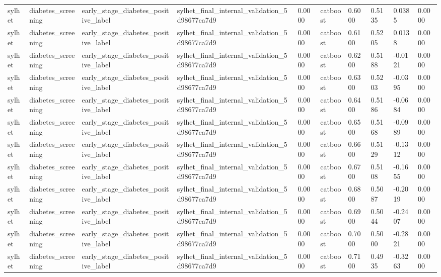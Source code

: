 \begin{tabular}{llllllllll}
sylhet & diabetes\_screening & early\_stage\_diabetes\_positive\_label & sylhet\_final\_internal\_validation\_5d98677ca7d9 & 0.0000 & catboost & 0.6000 & 0.5135 & 0.0385 & 0.0000 \\
sylhet & diabetes\_screening & early\_stage\_diabetes\_positive\_label & sylhet\_final\_internal\_validation\_5d98677ca7d9 & 0.0000 & catboost & 0.6100 & 0.5205 & 0.0138 & 0.0000 \\
sylhet & diabetes\_screening & early\_stage\_diabetes\_positive\_label & sylhet\_final\_internal\_validation\_5d98677ca7d9 & 0.0000 & catboost & 0.6200 & 0.5188 & -0.0121 & 0.0000 \\
sylhet & diabetes\_screening & early\_stage\_diabetes\_positive\_label & sylhet\_final\_internal\_validation\_5d98677ca7d9 & 0.0000 & catboost & 0.6300 & 0.5203 & -0.0395 & 0.0000 \\
sylhet & diabetes\_screening & early\_stage\_diabetes\_positive\_label & sylhet\_final\_internal\_validation\_5d98677ca7d9 & 0.0000 & catboost & 0.6400 & 0.5186 & -0.0684 & 0.0000 \\
sylhet & diabetes\_screening & early\_stage\_diabetes\_positive\_label & sylhet\_final\_internal\_validation\_5d98677ca7d9 & 0.0000 & catboost & 0.6500 & 0.5168 & -0.0989 & 0.0000 \\
sylhet & diabetes\_screening & early\_stage\_diabetes\_positive\_label & sylhet\_final\_internal\_validation\_5d98677ca7d9 & 0.0000 & catboost & 0.6600 & 0.5129 & -0.1312 & 0.0000 \\
sylhet & diabetes\_screening & early\_stage\_diabetes\_positive\_label & sylhet\_final\_internal\_validation\_5d98677ca7d9 & 0.0000 & catboost & 0.6700 & 0.5108 & -0.1655 & 0.0000 \\
sylhet & diabetes\_screening & early\_stage\_diabetes\_positive\_label & sylhet\_final\_internal\_validation\_5d98677ca7d9 & 0.0000 & catboost & 0.6800 & 0.5087 & -0.2019 & 0.0000 \\
sylhet & diabetes\_screening & early\_stage\_diabetes\_positive\_label & sylhet\_final\_internal\_validation\_5d98677ca7d9 & 0.0000 & catboost & 0.6900 & 0.5044 & -0.2407 & 0.0000 \\
sylhet & diabetes\_screening & early\_stage\_diabetes\_positive\_label & sylhet\_final\_internal\_validation\_5d98677ca7d9 & 0.0000 & catboost & 0.7000 & 0.5000 & -0.2821 & 0.0000 \\
sylhet & diabetes\_screening & early\_stage\_diabetes\_positive\_label & sylhet\_final\_internal\_validation\_5d98677ca7d9 & 0.0000 & catboost & 0.7100 & 0.4935 & -0.3263 & 0.0000 \\

\end{tabular}
